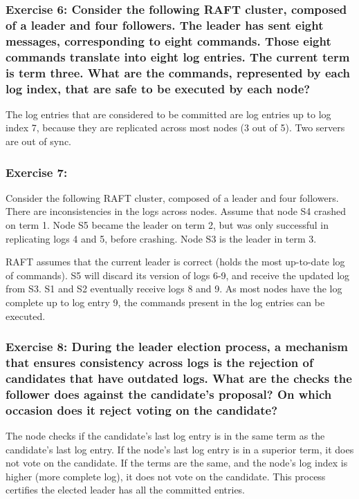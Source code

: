 \documentclass[12pt,a4paper]{article}
\begin{document}
\subsubsection*{Exercise 6: Consider the following RAFT cluster, composed of a leader and four followers. The leader has sent eight messages, corresponding to eight commands. Those eight commands translate into eight log entries. The current term is term three. What are the commands, represented by each log index, that are safe to be executed by each node?}

The log entries that are considered to be committed are log entries up to log index 7, because they are replicated across most nodes (3 out of 5). Two servers are out of sync.

\subsubsection*{Exercise 7:} Consider the following RAFT cluster, composed of a leader and four followers. There are inconsistencies in the logs across nodes. Assume that node S4 crashed on term 1. Node S5 became the leader on term 2, but was only successful in replicating logs 4 and 5, before crashing. Node S3 is the leader in term 3.

RAFT assumes that the current leader is correct (holds the most up-to-date log of commands). S5 will discard its version of logs 6-9, and receive the updated log from S3. S1 and S2 eventually receive logs 8 and 9. As most nodes have the log complete up to log entry 9, the commands present in the log entries can be executed.

\subsubsection*{Exercise 8: During the leader election process, a mechanism that ensures consistency across logs is the rejection of candidates that have outdated logs. What are the checks the follower does against the candidate's proposal? On which occasion does it reject voting on the candidate?}

The node checks if the candidate's last log entry is in the same term as the candidate's last log entry. If the node's last log entry is in a superior term, it does not vote on the candidate. If the terms are the same, and the node's log index is higher (more complete log), it does not vote on the candidate. This process certifies the elected leader has all the committed entries.
\end{document}
